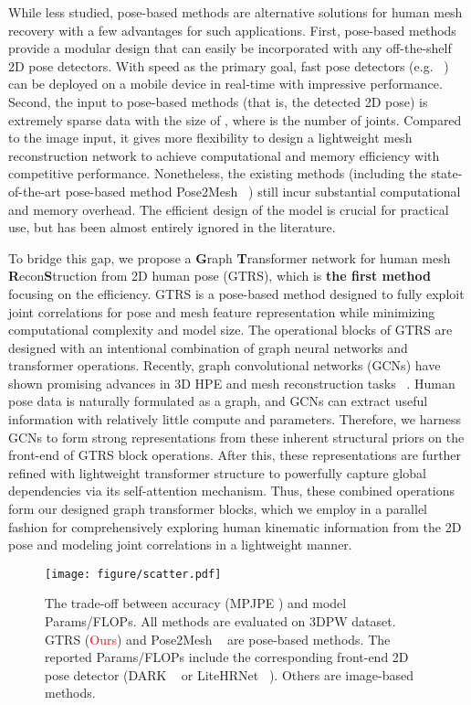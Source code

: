 \documentclass[sigconf]{acmart}
\begin{document}
While less studied, pose-based methods are alternative solutions for human mesh recovery with a few advantages for such applications. 
First, pose-based methods provide a modular design that can easily be incorporated with any off-the-shelf 2D pose detectors. With speed as the primary goal, fast pose detectors (e.g. ~\cite{osokin2018real,neff2021efficienthrnet,shen2021towards}) can be deployed on a mobile device in real-time with impressive performance. 
Second, the input to pose-based methods (that is, the detected 2D pose) is extremely sparse data with the size of , where  is the number of joints. Compared to the image input, it gives more flexibility to design a lightweight mesh reconstruction network to achieve computational and memory efficiency with competitive performance. 
Nonetheless, the existing methods (including the state-of-the-art pose-based method Pose2Mesh ~\cite{Choi_2020_ECCV_Pose2Mesh}) still incur substantial computational and memory overhead. The efficient design of the model is crucial for practical use, but has been almost entirely ignored in the literature.

To bridge this gap, we propose a \textbf{G}raph \textbf{T}ransformer network for human mesh \textbf{R}econ\textbf{S}truction from 2D human pose (GTRS), which is \textbf{the first method} focusing on the efficiency. 
GTRS is a pose-based method designed to fully exploit joint correlations for pose and mesh feature representation while minimizing computational complexity and model size. The operational blocks of GTRS are designed with an intentional combination of graph neural networks and transformer operations.
Recently, graph convolutional networks (GCNs) have shown promising advances in 3D HPE and mesh reconstruction tasks ~\cite{MGCN_2021_ICCV}. 
Human pose data is naturally formulated as a graph, and GCNs can extract useful information with relatively little compute and parameters. Therefore, we harness GCNs to form strong representations from these inherent structural priors on the front-end of GTRS block operations.
After this, these representations are further refined with lightweight transformer structure to powerfully capture global dependencies via its self-attention mechanism.
Thus, these combined operations form our designed graph transformer blocks, which we employ in a parallel fashion for comprehensively exploring human kinematic information from the 2D pose and modeling joint correlations in a lightweight manner.




\begin{figure}[htp]
\vspace{-10pt}
  \centering
  \texttt{[image: figure/scatter.pdf]}
  \vspace{-15pt}
  \caption{The trade-off between accuracy (MPJPE ) and model Params/FLOPs. All methods are evaluated on 3DPW dataset. GTRS (\textcolor{red}{Ours}) and Pose2Mesh ~\cite{Choi_2020_ECCV_Pose2Mesh} are pose-based methods. The reported Params/FLOPs include the corresponding front-end 2D pose detector (DARK ~\cite{darkpose_2020} or LiteHRNet ~\cite{LiteHRNet}). Others are image-based methods.}
  \label{fig:scatter}
  \vspace{-10pt}
\end{figure}
\end{document}
